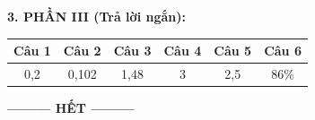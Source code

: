 \documentclass[12pt,a4paper]{article}
\begin{document}
\noindent
\textbf{3. PHẦN III (Trả lời ngắn):}
\begin{center}
\begin{tabular}{|c|c|c|c|c|c|}
\hline
\textbf{Câu 1} & \textbf{Câu 2} & \textbf{Câu 3} & \textbf{Câu 4} & \textbf{Câu 5} & \textbf{Câu 6} \\ \hline
0,2 & 0,102 & 1,48 & 3 & 2,5 & 86\% \\ \hline
\end{tabular}
\end{center}

\begin{center}
\textbf{--------- HẾT ---------}
\end{center}
\end{document}
